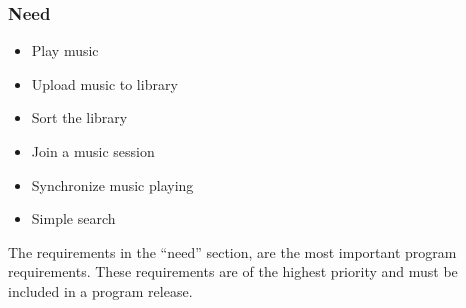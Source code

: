 \subsubsection{Need}


\begin{itemize}
	\item Play music
	\item Upload music to library
	\item Sort the library
	\item Join a music session
	\item Synchronize music playing
	\item Simple search
\end{itemize}


The requirements in the ``need'' section, are the most important program requirements. These
requirements are of the highest priority and must be included in a program release.